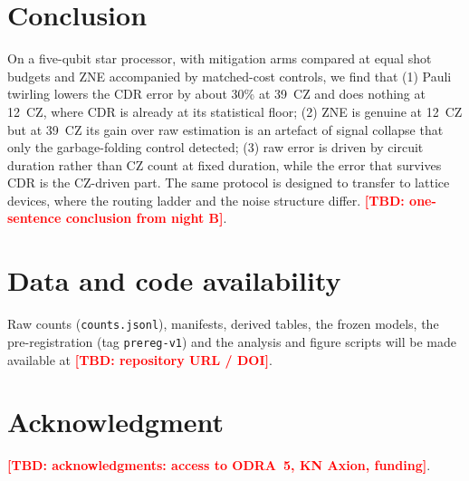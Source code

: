 \documentclass[conference]{IEEEtran}
\newcommand{\TBD}[1]{\textcolor{red}{\textbf{[TBD: #1]}}}
\begin{document}
\section{Conclusion}
On a five-qubit star processor, with mitigation arms compared at equal shot budgets and ZNE
accompanied by matched-cost controls, we find that (1) Pauli twirling lowers the CDR error by
about 30\% at 39~CZ and does nothing at 12~CZ, where CDR is already at its statistical floor;
(2) ZNE is genuine at 12~CZ but at 39~CZ its gain over raw estimation is an artefact of signal
collapse that only the garbage-folding control detected; (3) raw error is driven by circuit
duration rather than CZ count at fixed duration, while the error that survives CDR is the
CZ-driven part. The same protocol is designed to transfer to lattice devices, where the routing
ladder and the noise structure differ. \TBD{one-sentence conclusion from night B}.

\section*{Data and code availability}
Raw counts (\texttt{counts.jsonl}), manifests, derived tables, the frozen models, the
pre-registration (tag \texttt{prereg-v1}) and the analysis and figure scripts will be made
available at \TBD{repository URL / DOI}.

\section*{Acknowledgment}
\TBD{acknowledgments: access to ODRA~5, KN Axion, funding}.



\end{document}
